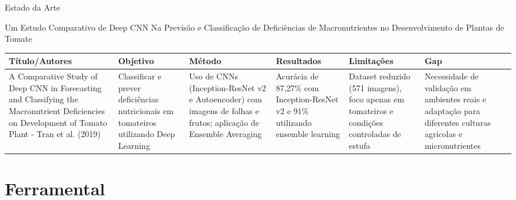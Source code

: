 \documentclass[aspectratio=169]{beamer}
\begin{document}
\begin{frame}[t]{Estado da Arte}
  \scriptsize
  
  Um Estudo Comparativo de Deep CNN Na Previsão e Classificação
  de Deficiências de Macronutrientes no Desenvolvimento de Plantas
  de Tomate
  \vspace{0.3cm}
  
  \begin{table}
    \centering
    \tiny
    \begin{tabular}{|p{2.5cm}|p{2cm}|p{2cm}|p{2cm}|p{2cm}|p{1.5cm}|}
      \hline
      \textbf{Título/Autores} & \textbf{Objetivo} & \textbf{Método} & \textbf{Resultados} & \textbf{Limitações} & \textbf{Gap} \\
      \hline
      A Comparative Study of Deep CNN in Forecasting and Classifying the Macronutrient Deficiencies on Development of Tomato Plant - Tran et al. (2019)
      & Classificar e prever deficiências nutricionais em tomateiros utilizando Deep Learning
      & Uso de CNNs (Inception-ResNet v2 e Autoencoder) com imagens de folhas e frutos; aplicação de Ensemble Averaging
      & Acurácia de 87,27\% com Inception-ResNet v2 e 91\% utilizando ensemble learning
      & Dataset reduzido (571 imagens), foco apenas em tomateiros e condições controladas de estufa
      & Necessidade de validação em ambientes reais e adaptação para diferentes culturas agrícolas e micronutrientes
      \\
      \hline

    \end{tabular}
  \end{table}
\end{frame}

\section{Ferramental}
\end{document}
